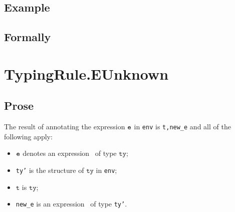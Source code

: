 \documentclass{book}
\newcommand\annotateexpr[1]{\textsf{annotate\_expr}(#1)}
\newcommand\vt[0]{\texttt{t}}
\newcommand\tty[0]{\texttt{ty}}
\newcommand\vli[0]{\texttt{li}}
\begin{document}
\begin{itemize}
  \subsection{Example}



\begin{emptyformal}
    \subsection{Formally}
\end{emptyformal}


\section{TypingRule.EUnknown \label{sec:TypingRule.EUnknown}}

  \subsection{Prose}
  The result of annotating the expression $\texttt{e}$ in \texttt{env} is
\texttt{t,new\_e} and all of the following apply:
  \begin{itemize}
  \item $\texttt{e}$ denotes an expression \UNKNOWN\  of type $\tty$;
  \item \texttt{ty'} is the structure of $\tty$ in \texttt{env};
  \item $\vt$ is $\tty$;
  \item \texttt{new\_e} is an expression \UNKNOWN\  of type \texttt{ty'}.
  \end{itemize}


\end{itemize}
\end{document}
